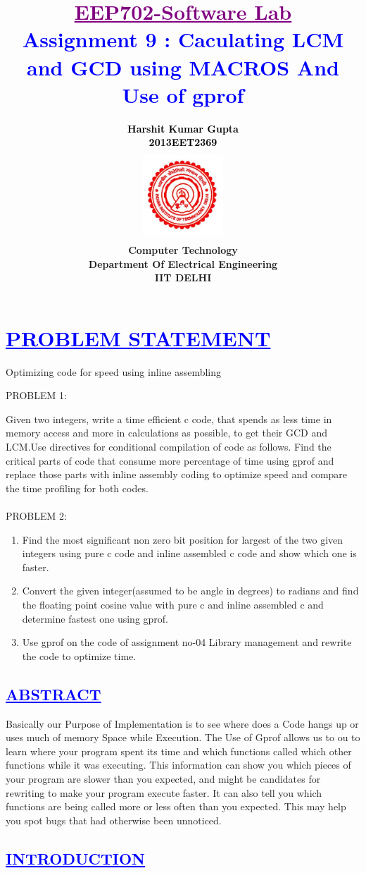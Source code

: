 \documentclass[a4paper,12pt]{report}
\title{\bfseries\huge \textcolor{purple}{\underline {EEP702-Software Lab}} \\{\textcolor{blue}{Assignment 9 : Caculating LCM and GCD using MACROS And Use of gprof}}}
\author{\bfseries\large\textcolor{black}  {Harshit Kumar Gupta}\\ {\textcolor{black} {2013EET2369 }}\\
\includegraphics[width=3cm,height=3.4cm]{./iit.png}\\\noindent Computer Technology\\
\noindent Department Of Electrical Engineering\\IIT DELHI}
\begin{document}
\maketitle
\tableofcontents


\chapter{\textcolor{blue}{\underline {PROBLEM STATEMENT}}}
\noindent Optimizing code for speed using inline assembling

PROBLEM 1:

\noindent Given two integers, write a time efficient c code, that spends as less time in memory access
and more in calculations as possible, to get their GCD and LCM.Use directives for conditional
compilation of code as follows. Find the critical parts of code that consume more percentage of time using gprof and replace
those parts with inline assembly coding to optimize speed and compare the time profiling for
both codes. \\\\

PROBLEM 2:
\begin{enumerate}
 \item Find the most significant non zero bit position for largest of the two given integers using pure c code and inline assembled c code and show which one is faster.
 \item Convert the given integer(assumed to be angle in degrees) to radians and find the floating point cosine value with pure c and inline assembled c and determine fastest one using gprof.
 \item Use gprof on the code of assignment no-04 Library management and rewrite the code to optimize time.

\end{enumerate}




\begin{center}
\chapter{\textcolor{blue}{\underline {ABSTRACT}}}
\end{center}
\noindent Basically our Purpose of Implementation is to see where does a Code hangs up or uses
much of memory Space while Execution. The Use of Gprof allows us to ou to learn where your program spent its time and which functions called which other functions while it was executing. This information can show you which pieces of your program are slower than you expected, and might be candidates for rewriting to make your program execute faster. It can also tell you which functions are being called more or less often than you expected.
This may help you spot bugs that had otherwise been unnoticed.
\begin{center}
\chapter{\textcolor{blue}{\underline {INTRODUCTION}}}
\end{center}
\noindent 
\end{document}
